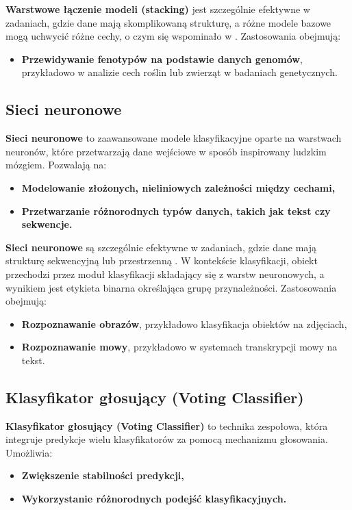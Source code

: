 \textbf{Warstwowe łączenie modeli (stacking)} jest szczególnie efektywne w zadaniach, gdzie dane mają skomplikowaną strukturę, a różne modele bazowe mogą uchwycić różne cechy, o czym się wspominało w \cite{liang2021stacking}. Zastosowania obejmują:
\begin{itemize}
	\item
	      \textbf{Przewidywanie fenotypów na podstawie danych genomów}, przykładowo w analizie cech roślin lub zwierząt w badaniach genetycznych.
\end{itemize}

\subsection{Sieci neuronowe}
\textbf{Sieci neuronowe} to zaawansowane modele klasyfikacyjne oparte na warstwach neuronów, które przetwarzają dane wejściowe w sposób inspirowany ludzkim mózgiem. Pozwalają na:
\begin{itemize}
	\item
	      \textbf{Modelowanie złożonych, nieliniowych zależności między cechami,}
	\item
	      \textbf{Przetwarzanie różnorodnych typów danych, takich jak tekst czy sekwencje.}
\end{itemize}

\textbf{Sieci neuronowe} są szczególnie efektywne w zadaniach, gdzie dane mają strukturę sekwencyjną lub przestrzenną \cite{NeuralNetworks}. W kontekście klasyfikacji, obiekt przechodzi przez moduł klasyfikacji składający się z warstw neuronowych, a wynikiem jest etykieta binarna określająca grupę przynależności. Zastosowania obejmują:
\begin{itemize}
	\item
	      \textbf{Rozpoznawanie obrazów}, przykładowo klasyfikacja obiektów na zdjęciach,
	\item
	      \textbf{Rozpoznawanie mowy}, przykładowo w systemach transkrypcji mowy na tekst.
\end{itemize}

\subsection{Klasyfikator głosujący (Voting Classifier)}
\textbf{Klasyfikator głosujący (Voting Classifier)} to technika zespołowa, która integruje predykcje wielu klasyfikatorów za pomocą mechanizmu głosowania. Umożliwia:

\begin{itemize}
	\item
	      \textbf{Zwiększenie stabilności predykcji,}
	\item
	      \textbf{Wykorzystanie różnorodnych podejść klasyfikacyjnych.}
\end{itemize}

